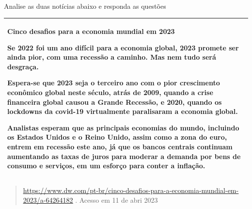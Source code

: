 {{\begin{escolha}


Analise as duas notícias abaixo e responda as questões

\begin{longtable}[]{@{}
  >{\raggedright\arraybackslash}p{}@{}}
\toprule
\endhead
\textbf{Cinco desafios para a economia mundial em 2023}

Se 2022 foi um ano difícil para a economia global, 2023 promete ser
ainda pior, com uma recessão a caminho. Mas nem tudo será desgraça.

Espera-se que 2023 seja o terceiro ano com o pior crescimento econômico
global neste século, atrás de 2009, quando a crise financeira global
causou a Grande Recessão, e 2020, quando os lockdowns da covid-19
virtualmente paralisaram a economia global.

Analistas esperam que as principais economias do mundo, incluindo os
Estados Unidos e o Reino Unido, assim como a zona do euro, entrem em
recessão este ano, já que os bancos centrais continuam aumentando as
taxas de juros para moderar a demanda por bens de consumo e serviços, em
um esforço para conter a inflação. \\
\bottomrule
\end{longtable}

\begin{quote}
\href{https://www.dw.com/pt-br/cinco-desafios-para-a-economia-mundial-em-2023/a-64264182}{\uline{https://www.dw.com/pt-br/cinco-desafios-para-a-economia-mundial-em-2023/a-64264182}}
. Acesso em 11 de abri 2023
\end{quote}


\end{escolha}}}
